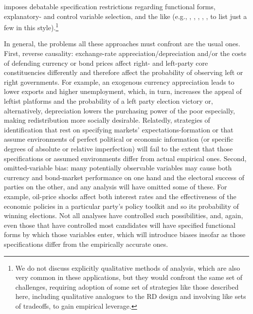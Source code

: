 \documentclass[12pt]{article}
\begin{document}
imposes debatable specification restrictions regarding functional forms, explanatory- and control variable selection, and the like (e.g., \citet{Garrett1998}, \citet{Franzese2002}, \citet{Clark2003}, \citet{Mosley2003}, \citet{Bernhard2006}, to list just a few in this style).\footnote{We do not discuss explicitly qualitative methods of analysis, which are also very common in these applications, but they would confront the same set of challenges, requiring adoption of some set of strategies like those described here, including qualitative analogues to the RD design and involving like sets of tradeoffs, to gain empirical leverage.}

In general, the problems all these approaches must confront are the usual ones. First, reverse causality: exchange-rate appreciation/depreciation and/or the costs of defending currency or bond prices affect right- and left-party core constituencies differently and therefore affect the probability of observing left or right governments. For example, an exogenous currency appreciation leads to lower exports and higher unemployment, which, in turn, increases the appeal of leftist platforms and the probability of a left party election victory or, alternatively, depreciation lowers the purchasing power of the poor especially, making redistribution more socially desirable. Relatedly, strategies of identification that rest on specifying markets' expectations-formation or that assume environments of perfect political or economic information (or specific degrees of absolute or relative imperfection) will fail to the extent that those specifications or assumed environments differ from actual empirical ones. Second, omitted-variable bias: many potentially observable variables may cause both currency and bond-market performance on one hand and the electoral success of parties on the other, and any analysis will have omitted some of these. For example, oil-price shocks affect both interest rates and the effectiveness of the economic policies in a particular party's policy toolkit and so its probability of winning elections. Not all analyses have controlled such possibilities, and, again, even those that have controlled most candidates will have specified functional forms by which those variables enter, which will introduce biases insofar as those specifications differ from the empirically accurate ones.
\end{document}
